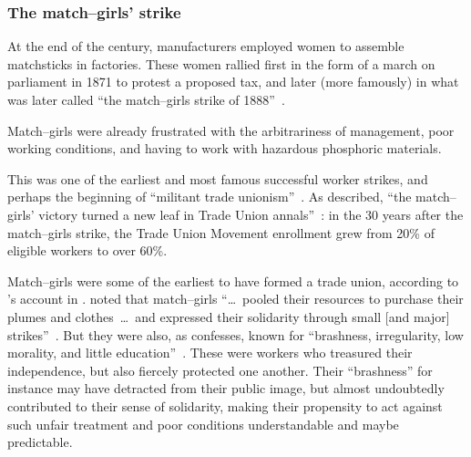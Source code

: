 \documentclass[trackingWork]{subfiles}
\begin{document}
\subsubsection{The match--girls' strike}

At the end of the  century,
manufacturers employed women to assemble matchsticks in factories.
These women rallied first in the form of a march on parliament in 1871 to protest a proposed tax, and 
later (more famously) in what was later called ``the match--girls strike of 1888''~\cite{10.2307/3827491}.

Match--girls were already frustrated with
the arbitrariness of management,
poor working conditions, and
having to work with hazardous phosphoric materials.

This was one of the earliest and most famous successful worker strikes,
and perhaps the beginning of ``militant trade unionism''~\cite{10.2307/3827491}.
As \citeauthor{weyer1894history} described,
``the match--girls' victory turned a new leaf in Trade Union annals''~\cite{weyer1894history}: in the 30 years after the match--girls strike,
the Trade Union Movement enrollment grew from 20\% of eligible workers to over 60\%.

Match--girls were some of the earliest to have formed a trade union,
according to \citeauthor{booth1903life}'s account in \citeyear{booth1903life}. %
\citeauthor{10.2307/3827491} noted that match--girls
``\dots~pooled their resources to purchase their plumes and clothes~\dots~and expressed their solidarity through small [and major] strikes''~\cite{booth1903life}.
But they were also, as \citeauthor{10.2307/3827491} confesses, known for ``brashness, irregularity, low morality, and little education''~\cite{10.2307/3827491}.
These were workers who treasured their independence, but also fiercely protected one another. %
Their ``brashness'' for instance may have detracted from their public image, but almost undoubtedly contributed to their sense of solidarity,
making their propensity to act against such unfair treatment and poor conditions understandable and maybe predictable.
\end{document}
